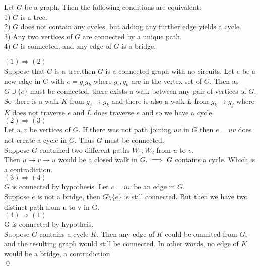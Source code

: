 \documentclass[../main.tex]{subfiles}
\begin{document}
 \begin{lem}\cite{jungnickel}
 Let $G$ be a graph. Then the following conditions are equivalent:\\
 1) $G$ is a tree.\\
 2) $G$ does not contain any cycles, but adding any further edge yields a cycle.\\
 3) Any two vertices of $G$ are connected by a unique path.\\
 4) $G$ is connected, and any edge of $G$ is a bridge.
 \end{lem}
 
 \noindent\Proof $(1) \Longrightarrow (2)$\\
 \noindent Suppose that $G$ is a tree,then $G$ is a connected graph with no circuits. Let $e$ be a new edge in G with $e = g_ig_k$ where $g_i,g_k$ are in the vertex set of $G.$ Then as $G \cup \{e\}$ must be connected, there exists a walk between any pair of vertices of $G$. So there is a walk $K$ from $g_j \rightarrow g_k$ and there is also a walk $L$ from $g_k \rightarrow g_j$ where $K$ does not traverse $e$ and $L$ does traverse $e$ and so we have a cycle.\\

\noindent\Proof $(2) \Longrightarrow (3)$\\
\noindent Let $u,v$ be vertices of $G.$ If there was not path joining $uv$ in $G$ then $e = uv$ does not create a cycle in $G.$ Thus $G$ must be connected.\\
\noindent Suppose $G$ contained two different paths $W_1, W_2$ from $u$ to $v.$\\
\noindent Then $ u \longrightarrow v \longrightarrow u$ would be a closed walk in $G. \\ \implies G$ contains a cycle. Which is a contradiction.\\

\noindent\Proof $(3) \Longrightarrow (4)$\\
\noindent $G$ is connected by hypothesis. Let $e = uv$ be an edge in $G.$\\
\noindent Suppose $e$ is not a bridge, then $G \setminus \{e\}$ is still connected. But then we have two distinct path from u to v in G.\\

\noindent\Proof $(4) \Longrightarrow (1)$\\
\noindent G is connected by hypotheis.\\
\noindent Suppose $G$ contains a cycle $K.$ Then any edge of $K$ could be ommited from $G,$ and the resulting graph would still be connected. In other words, no edge of $K$ would be a bridge, a contradiction.\\
\qed
\end{document}
